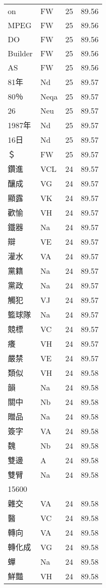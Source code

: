 \documentclass[twocolumn]{book}
\begin{document}
\begin{supertabular}{llrr}
on & FW & 25 &  89.56\\
MPEG & FW & 25 &  89.56\\
DO & FW & 25 &  89.56\\
Builder & FW & 25 &  89.56\\
AS & FW & 25 &  89.56\\
81年 & Nd & 25 &  89.57\\
80％ & Neqa & 25 &  89.57\\
26 & Neu & 25 &  89.57\\
1987年 & Nd & 25 &  89.57\\
16日 & Nd & 25 &  89.57\\
＄ & FW & 25 &  89.57\\
鑽進 & VCL & 24 &  89.57\\
釀成 & VG & 24 &  89.57\\
顯露 & VK & 24 &  89.57\\
歡愉 & VH & 24 &  89.57\\
鐵器 & Na & 24 &  89.57\\
辯 & VE & 24 &  89.57\\
灌水 & VA & 24 &  89.57\\
黨籍 & Na & 24 &  89.57\\
黨政 & Na & 24 &  89.57\\
觸犯 & VJ & 24 &  89.57\\
籃球隊 & Na & 24 &  89.57\\
競標 & VC & 24 &  89.57\\
癢 & VH & 24 &  89.57\\
嚴禁 & VE & 24 &  89.57\\
類似 & VH & 24 &  89.58\\
韻 & Na & 24 &  89.58\\
關中 & Nb & 24 &  89.58\\
贈品 & Na & 24 &  89.58\\
簽字 & VA & 24 &  89.58\\
魏 & Nb & 24 &  89.58\\
雙邊 & A & 24 &  89.58\\
雙臂 & Na & 24 &  89.58\\
15600\\
雜交 & VA & 24 &  89.58\\
醫 & VC & 24 &  89.58\\
轉向 & VA & 24 &  89.58\\
轉化成 & VG & 24 &  89.58\\
蟬 & Na & 24 &  89.58\\
鮮豔 & VH & 24 &  89.58\\

\end{supertabular}
\end{document}
